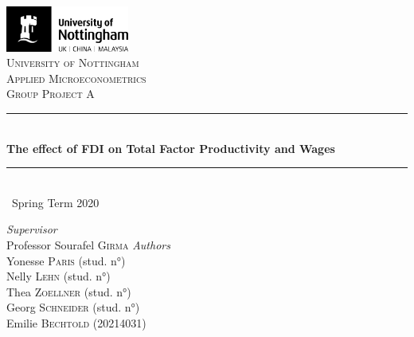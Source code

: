 \documentclass[a4paper,11pt]{scrartcl}
\newcommand{\sectionnumbering}[1]{%
  \setcounter{section}{0}%
   \renewcommand{\thesection}{\csname #1\endcsname{section}}}
\begin{document}
	\begin{titlepage}
		\newcommand{\HRule}{\rule{\linewidth}{0.5mm}}
		
	\vfill\vfill
	\includegraphics[height=1.5cm]{UoN_Logo}\\[1cm] 


	\center			
	\textsc{\LARGE University of Nottingham}\\[1.5cm] 
	\textsc{\Large Applied Microeconometrics}\\[0.5cm] 	
	\textsc{\large Group Project A}\\[0.5cm] 
	
	\HRule\\[0.4cm]
	{\huge\bfseries The effect of FDI on Total Factor Productivity and Wages}\\[0.4cm] 
	\HRule\\[0.4cm]
	
	{\large\ Spring Term 2020} 	
	\vfill\vfill\vfill 		
	
\begin{flushleft}
			\large
			\textit{Supervisor}\\
			Professor Sourafel \textsc{Girma} 
			\vfill\vfill 
			\textit{Authors}\\
			Yonesse \textsc{Paris} (stud. n°)\\
			Nelly  \textsc{Lehn} (stud. n°)\\
			Thea  \textsc{Zoellner} (stud. n°)\\
			Georg  \textsc{Schneider} (stud. n°)\\
			Emilie \textsc{Bechtold} (20214031)
		\end{flushleft}
	\vfill 
	
\end{titlepage}


\sectionnumbering{Roman}
\tableofcontents

\newpage

\listoftables
\newpage

\sectionnumbering{arabic}
\end{document}
